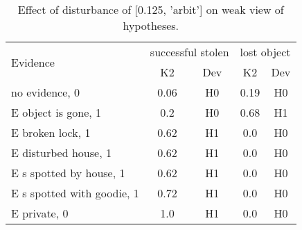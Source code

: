 \begin{table}\begin{tabular}{l|cc|cc}\toprule\multirow{2}{*}{Evidence} & \multicolumn{2}{c}{successful stolen}& \multicolumn{2}{c}{lost object}\\& {K2} & {Dev}& {K2} & {Dev}\\\midrule
no evidence, 0 & \cellcolor{Bittersweet}0.06&\cellcolor{Bittersweet}H0&\cellcolor{Bittersweet}0.19&\cellcolor{Bittersweet}H0\\E object is gone, 1 & \cellcolor{Bittersweet}0.2&\cellcolor{Bittersweet}H0&\cellcolor{Bittersweet}0.68&\cellcolor{Bittersweet}H1\\E broken lock, 1 & \cellcolor{Bittersweet}0.62&\cellcolor{Bittersweet}H1&\cellcolor{Bittersweet}0.0&\cellcolor{Bittersweet}H0\\E disturbed house, 1 & \cellcolor{Bittersweet}0.62&\cellcolor{Bittersweet}H1&\cellcolor{Bittersweet}0.0&\cellcolor{Bittersweet}H0\\E s spotted by house, 1 & \cellcolor{Bittersweet}0.62&\cellcolor{Bittersweet}H1&\cellcolor{Bittersweet}0.0&\cellcolor{Bittersweet}H0\\E s spotted with goodie, 1 & \cellcolor{Bittersweet}0.72&\cellcolor{Bittersweet}H1&\cellcolor{Bittersweet}0.0&\cellcolor{Bittersweet}H0\\E private, 0 & \cellcolor{Bittersweet}1.0&\cellcolor{Bittersweet}H1&\cellcolor{Bittersweet}0.0&\cellcolor{Bittersweet}H0\\\bottomrule\end{tabular}\caption{Effect of disturbance of [0.125, 'arbit'] on weak view of hypotheses.}\end{table}